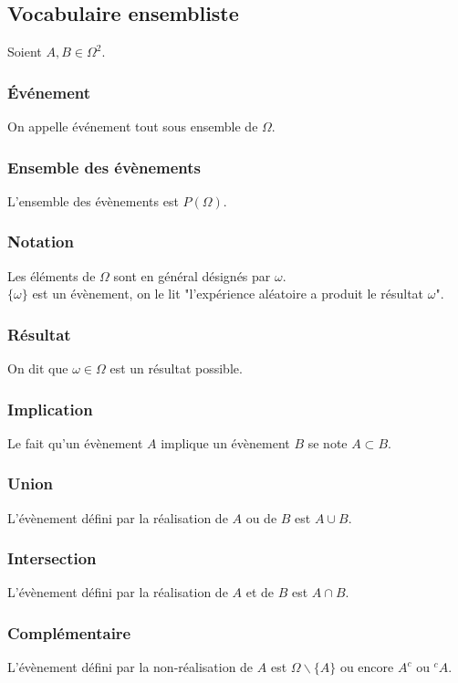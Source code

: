 \documentclass[a4paper,10pt]{book} %
\begin{document}
\subsection{Vocabulaire ensembliste}
Soient $A,B\in \Omega^2$.

\subsubsection{Événement}
On appelle événement tout sous ensemble de $\Omega$.

\subsubsection{Ensemble des évènements}
L'ensemble des évènements est $P(\Omega)$.

\subsubsection{Notation}
Les éléments de $\Omega$ sont en général désignés par $\omega$.\\

$\{\omega\}$ est un évènement, on le lit "l'expérience aléatoire a produit le résultat $\omega$".

\subsubsection{Résultat}
On dit que $\omega\in \Omega$ est un résultat possible.

\subsubsection{Implication}
Le fait qu'un évènement $A$ implique un évènement $B$ se note $A\subset B$.

\subsubsection{Union}
L'évènement défini par la réalisation de $A$ ou de $B$ est $A\cup B$.

\subsubsection{Intersection}
L'évènement défini par la réalisation de $A$ et de $B$ est $A\cap B$.

\subsubsection{Complémentaire}
L'évènement défini par la non-réalisation de $A$ est $\Omega\backslash\{A\}$ ou encore $A^c$ ou ${}^cA$.
\end{document}
